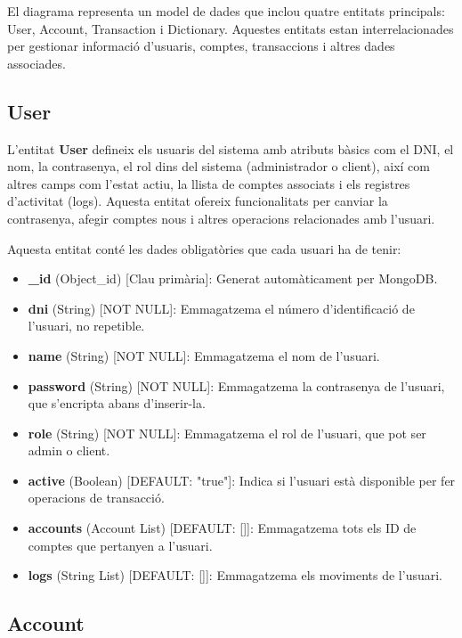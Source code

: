 \documentclass[a4paper,12pt,twoside]{ThesisStyle}
\begin{document}
El diagrama representa un model de dades que inclou quatre entitats principals: User, Account, Transaction i Dictionary. Aquestes entitats estan interrelacionades per gestionar informació d'usuaris, comptes, transaccions i altres dades associades.

\subsection{User}
\label{subsec: User}


L'entitat \textbf{User} defineix els usuaris del sistema amb atributs bàsics com el DNI, el nom, la contrasenya, el rol dins del sistema (administrador o client), així com altres camps com l'estat actiu, la llista de comptes associats i els registres d'activitat (logs). Aquesta entitat ofereix funcionalitats per canviar la contrasenya, afegir comptes nous i altres operacions relacionades amb l'usuari. 

Aquesta entitat conté les dades obligatòries que cada usuari ha de tenir:

\begin{itemize}
    \item \textbf{\_id} (Object\_id) [Clau primària]: Generat automàticament per MongoDB.
    \item \textbf{dni} (String) [NOT NULL]: Emmagatzema el número d'identificació de l'usuari, no repetible.
    \item \textbf{name} (String) [NOT NULL]: Emmagatzema el nom de l'usuari.
    \item \textbf{password} (String) [NOT NULL]: Emmagatzema la contrasenya de l'usuari, que s'encripta abans d'inserir-la.
    \item \textbf{role} (String) [NOT NULL]: Emmagatzema el rol de l'usuari, que pot ser admin o client.
    \item \textbf{active} (Boolean) [DEFAULT: "true"]: Indica si l'usuari està disponible per fer operacions de transacció.
    \item \textbf{accounts} (Account List) [DEFAULT: []]: Emmagatzema tots els ID de comptes que pertanyen a l'usuari.
    \item \textbf{logs} (String List) [DEFAULT: []]: Emmagatzema els moviments de l'usuari.
\end{itemize}


\subsection{Account}
\label{subsec: Account}
\end{document}
